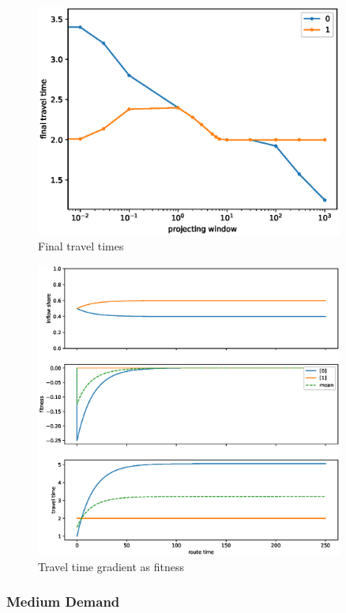 \documentclass[12pt]{article}
\begin{document}
\begin{figure}
	\includegraphics[width=0.9\textwidth]{img/final_tt_proj.eps}
	\caption{ Final travel times }
	\label{fig:final_tt_proj}

\end{figure}

\begin{figure}
	\includegraphics[width=0.9\textwidth]{img/replicator_grad_tt.eps}
	\caption{ Travel time gradient as fitness }
	\label{fig:replicator_grad_tt}

\end{figure}

\newpage
\subsubsection*{Medium Demand}
\end{document}

